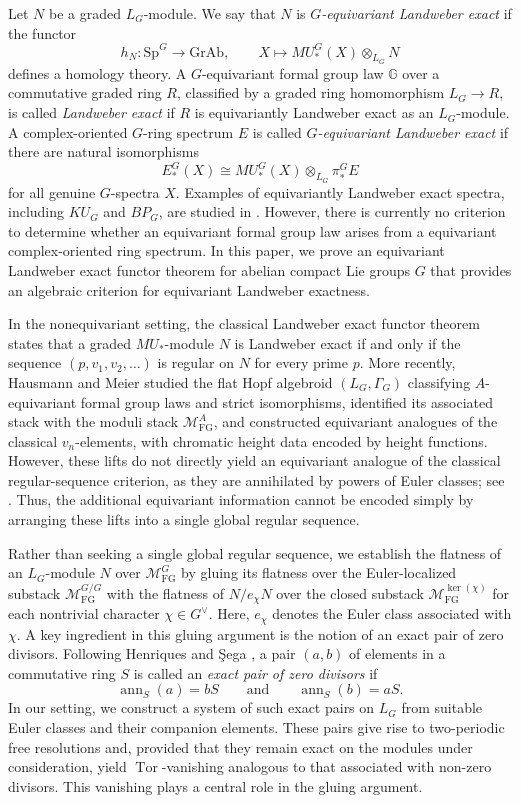 \documentclass[11pt,reqno]{amsart}
\newcommand{\Sp}{\mathrm{Sp}}
\newcommand{\GrAb}{\mathrm{GrAb}}
\newcommand{\Tor}{\operatorname{Tor}}
\newcommand{\MFG}{\mathcal M_{\mathrm{FG}}}
\begin{document}
Let $N$ be a graded $L_G$-module. We say that $N$ is \emph{$G$-equivariant Landweber exact} if the functor
\[
h_N\colon \Sp^G\longrightarrow\GrAb, \qquad X\longmapsto  MU_*^G(X)\otimes_{L_G}N
\]
defines a homology theory. A $G$-equivariant formal group law $\mathbb G$ over a commutative graded ring $R$, classified by a graded ring homomorphism $L_G\to R$, is called \emph{Landweber exact} if $R$ is equivariantly Landweber
exact as an $L_G$-module. A complex-oriented $G$-ring spectrum $E$ is called \emph{$G$-equivariant Landweber exact} if there are natural isomorphisms
\[
E_*^G(X)\cong  MU_*^G(X)\otimes_{L_G}\pi_*^G E
\]
for all genuine $G$-spectra $X$. Examples of equivariantly Landweber exact spectra, including $KU_G$ and $BP_G$, are studied in \cite{wisdom2024properties}. However, there is currently no criterion to determine whether an equivariant formal group law arises from a equivariant complex-oriented ring spectrum. In this paper, we prove an equivariant Landweber exact functor theorem for abelian compact Lie groups $G$ that provides an algebraic criterion for equivariant Landweber exactness.

In the nonequivariant setting, the classical Landweber exact functor theorem states that a graded $MU_*$-module $N$ is Landweber exact if and only if the sequence $(p,v_1,v_2,\dots)$ is regular on $N$ for every prime $p$. More recently, Hausmann and Meier \cite{hausmann2023invariant} studied the flat Hopf algebroid $(L_G,\Gamma_G)$ classifying $A$-equivariant formal group laws and strict isomorphisms, identified its associated stack with the moduli stack $\MFG^A$, and constructed equivariant analogues of the classical $v_n$-elements, with chromatic height data encoded by height functions. However, these lifts do not directly yield an equivariant analogue of the classical regular-sequence criterion, as they are annihilated by powers of Euler classes; see \cite[Remark 6.7]{hausmann2023invariant}. Thus, the additional equivariant information cannot be encoded simply by arranging these lifts into a single global regular sequence.

Rather than seeking a single global regular sequence, we establish the flatness of an $L_G$-module $N$ over $\MFG^G$ by gluing its flatness over the Euler-localized substack $\MFG^{G/G}$ with the flatness of $N/e_\chi N$ over the closed substack $\MFG^{\ker(\chi)}$ for each nontrivial character $\chi\in G^\vee$. Here, $e_\chi$ denotes the Euler class associated with $\chi$. A key ingredient in this gluing argument is the notion of an exact pair of zero divisors. Following Henriques and \c{S}ega \cite{bonacho2011free}, a pair $(a,b)$ of elements in a commutative ring $S$ is called an \emph{exact pair of zero divisors} if
\[
\operatorname{ann}_S(a)=bS \qquad\text{and}\qquad \operatorname{ann}_S(b)=aS.
\]
In our setting, we construct a system of such exact pairs on $L_G$ from suitable Euler classes and their companion elements. These pairs give rise to two-periodic free resolutions and, provided that they remain exact on the modules under consideration, yield $\Tor$-vanishing analogous to that associated with non-zero divisors. This vanishing plays a central role in the gluing argument.
\end{document}
